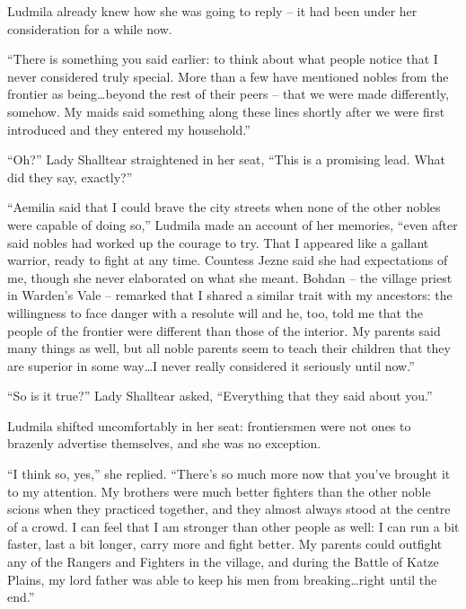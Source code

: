  

Ludmila already knew how she was going to reply – it had been under her consideration for a while now.

 

“There is something you said earlier: to think about what people notice that I never considered truly special. More than a few have mentioned nobles from the frontier as being…beyond the rest of their peers – that we were made differently, somehow. My maids said something along these lines shortly after we were first introduced and they entered my household.”

 

“Oh?” Lady Shalltear straightened in her seat, “This is a promising lead. What did they say, exactly?”

 

“Aemilia said that I could brave the city streets when none of the other nobles were capable of doing so,” Ludmila made an account of her memories, “even after said nobles had worked up the courage to try. That I appeared like a gallant warrior, ready to fight at any time. Countess Jezne said she had expectations of me, though she never elaborated on what she meant. Bohdan – the village priest in Warden’s Vale – remarked that I shared a similar trait with my ancestors: the willingness to face danger with a resolute will and he, too, told me that the people of the frontier were different than those of the interior. My parents said many things as well, but all noble parents seem to teach their children that they are superior in some way…I never really considered it seriously until now.”

 

“So is it true?” Lady Shalltear asked, “Everything that they said about you.”

 

Ludmila shifted uncomfortably in her seat: frontiersmen were not ones to brazenly advertise themselves, and she was no exception.

 

“I think so, yes,” she replied. “There’s so much more now that you’ve brought it to my attention. My brothers were much better fighters than the other noble scions when they practiced together, and they almost always stood at the centre of a crowd. I can feel that I am stronger than other people as well: I can run a bit faster, last a bit longer, carry more and fight better. My parents could outfight any of the Rangers and Fighters in the village, and during the Battle of Katze Plains, my lord father was able to keep his men from breaking…right until the end.”

